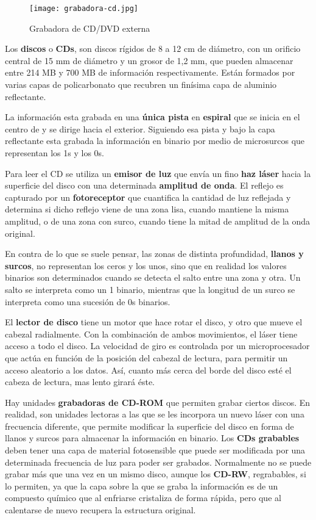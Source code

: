 \begin{itemize}
    \begin{figure}[ht]
        \centering
        \texttt{[image: grabadora-cd.jpg]}
        \caption{Grabadora de CD/DVD	 externa}
    \end{figure}

    Los \textbf{discos} o \textbf{CDs}, son discos rígidos de 8 a 12 cm de diámetro, con un orificio central de 15 mm de diámetro y un grosor de 1,2 mm, que pueden almacenar entre 214 MB y 700 MB de información respectivamente. Están formados por varias capas de policarbonato que recubren un finísima capa de aluminio reflectante.

    La información esta grabada en una \textbf{única pista} en \textbf{espiral} que se inicia en el centro de y se dirige hacia el exterior. Siguiendo esa pista y bajo la capa reflectante esta grabada la información en binario por medio de microsurcos que representan los 1s y los 0s.

    Para leer el CD se utiliza un \textbf{emisor de luz} que envía un fino \textbf{haz láser} hacia la superficie del disco con una determinada \textbf{amplitud de onda}. El reflejo es capturado por un \textbf{fotoreceptor} que cuantifica la cantidad de luz reflejada y determina si dicho reflejo viene de una zona lisa, cuando mantiene la misma amplitud, o de una zona con surco, cuando tiene la mitad de amplitud de la onda original.

    En contra de lo que se suele pensar, las zonas de distinta profundidad, \textbf{llanos y surcos}, no representan los ceros y los unos, sino que en realidad los valores binarios son determinados cuando se detecta el salto entre una zona y otra. Un salto se interpreta como un 1 binario, mientras que la longitud de un surco se interpreta como una sucesión de 0s binarios.

    El \textbf{lector de disco} tiene un motor que hace rotar el disco, y otro que mueve el cabezal radialmente. Con la combinación de ambos movimientos, el láser tiene acceso a todo el disco. La velocidad de giro es controlada por un microprocesador que actúa en función de la posición del cabezal de lectura, para permitir un acceso aleatorio a los datos. Así, cuanto más cerca del borde del disco esté el cabeza de lectura, mas lento girará éste.

    Hay unidades \textbf{grabadoras de CD-ROM} que permiten grabar ciertos discos. En realidad, son unidades lectoras a las que se les incorpora un nuevo láser con una frecuencia diferente, que permite modificar la superficie del disco en forma de llanos y surcos para almacenar la información en binario. Los \textbf{CDs grabables} deben tener una capa de material fotosensible que puede ser modificada por una determinada frecuencia de luz para poder ser grabados. Normalmente no se puede grabar más que una vez en un mismo disco, aunque los \textbf{CD-RW}, regrabables, si lo permiten, ya que la capa sobre la que se graba la información es de un compuesto químico que al enfriarse cristaliza de forma rápida, pero que al calentarse de nuevo recupera la estructura original.



\end{itemize}
